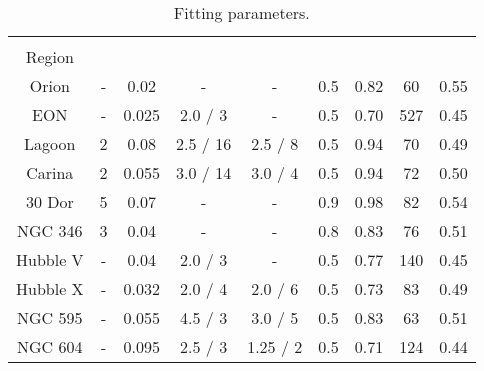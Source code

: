 \begin{table*}
\begin{center}\caption{Fitting parameters.}
\begin{tabular}{cCCCCCCCC}\toprule
\hii{}    &   &   &      &       &   &  &  & \\
Region    &   &  &  &   &   &  &  & \\
\midrule
Orion     & - & 0.02    &  -           &   -        & 0.5  & 0.82 & 60  & 0.55\\
EON       & - & 0.025   &  2.0 / 3     &   -        & 0.5  & 0.70 & 527 & 0.45\\
Lagoon    & 2 & 0.08    &  2.5 / 16    &   2.5 / 8  & 0.5  & 0.94 & 70  & 0.49\\
Carina    & 2 & 0.055   &  3.0 / 14    &   3.0 / 4  & 0.5  & 0.94 & 72  & 0.50\\
30 Dor    & 5 &  0.07   &  -           &   -        & 0.9  & 0.98 & 82  & 0.54\\
NGC 346   & 3 & 0.04    &  -           &   -        & 0.8  & 0.83 & 76  & 0.51\\
Hubble V  & - & 0.04    &  2.0 / 3     &   -        & 0.5  & 0.77 & 140 & 0.45\\
Hubble X  & - & 0.032   &  2.0 / 4     &   2.0 / 6  & 0.5  & 0.73 & 83  & 0.49\\
NGC 595   & - &  0.055  &  4.5 / 3     &   3.0 / 5  & 0.5  & 0.83 & 63  & 0.51\\
NGC 604   & - &  0.095  &   2.5 / 3    &   1.25 / 2 & 0.5  & 0.71 & 124 & 0.44\\
\bottomrule
\end{tabular}\label{tab:fitting-parameters}
\end{center}
\end{table*} 